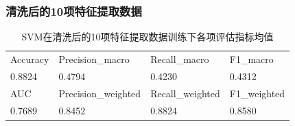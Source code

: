 \documentclass[10pt]{article}
\begin{document}
\subsubsection*{清洗后的10项特征提取数据}
\begin{table}[H]
  \centering
  \caption{SVM在清洗后的10项特征提取数据训练下各项评估指标均值}
  \begin{tabular}{llll}
  \toprule
  Accuracy & Precision\_macro & Recall\_macro & F1\_macro \\
  0.8824 & 0.4794 & 0.4230 & 0.4312 \\
  \midrule
  AUC & Precision\_weighted & Recall\_weighted & F1\_weighted \\
  0.7689 & 0.8452 & 0.8824 & 0.8580 \\
  \bottomrule
  \end{tabular}
\end{table}
\end{document}
